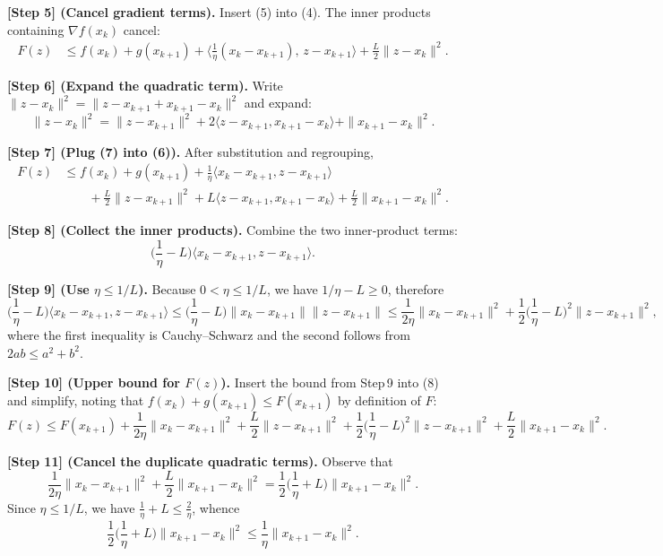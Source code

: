 \documentclass{article}
\begin{document}
\noindent\textbf{[Step 5] (Cancel gradient terms).}  
Insert (5) into (4). The inner products containing $\nabla f(x_{k})$ cancel:
\[
\begin{aligned}
F(z)&\le f(x_{k})+g(x_{k+1})
+\Big\langle\frac{1}{\eta}(x_{k}-x_{k+1}),\,z-x_{k+1}\Big\rangle
+\frac{L}{2}\|z-x_{k}\|^{2}.
\end{aligned}
\tag{6}
\]

\noindent\textbf{[Step 6] (Expand the quadratic term).}  
Write $\|z-x_{k}\|^{2}= \|z-x_{k+1}+x_{k+1}-x_{k}\|^{2}$ and expand:
\[
\|z-x_{k}\|^{2}= \|z-x_{k+1}\|^{2}+2\langle z-x_{k+1},x_{k+1}-x_{k}\rangle+\|x_{k+1}-x_{k}\|^{2}.
\tag{7}
\]

\noindent\textbf{[Step 7] (Plug (7) into (6)).}  
After substitution and regrouping,
\[
\begin{aligned}
F(z)&\le f(x_{k})+g(x_{k+1})
+\frac{1}{\eta}\langle x_{k}-x_{k+1},z-x_{k+1}\rangle\\
&\qquad+\frac{L}{2}\|z-x_{k+1}\|^{2}
+L\langle z-x_{k+1},x_{k+1}-x_{k}\rangle
+\frac{L}{2}\|x_{k+1}-x_{k}\|^{2}.
\end{aligned}
\tag{8}
\]

\noindent\textbf{[Step 8] (Collect the inner products).}  
Combine the two inner‑product terms:
\[
\Big(\frac{1}{\eta}-L\Big)\langle x_{k}-x_{k+1},z-x_{k+1}\rangle.
\tag{9}
\]

\noindent\textbf{[Step 9] (Use $\eta\le 1/L$).}  
Because $0<\eta\le 1/L$, we have $1/\eta-L\ge0$, therefore
\[
\Big(\frac{1}{\eta}-L\Big)\langle x_{k}-x_{k+1},z-x_{k+1}\rangle
\le \Big(\frac{1}{\eta}-L\Big)\|x_{k}-x_{k+1}\|\|z-x_{k+1}\|
\le \frac{1}{2\eta}\|x_{k}-x_{k+1}\|^{2}
+\frac{1}{2}\Big(\frac{1}{\eta}-L\Big)^{2}\|z-x_{k+1}\|^{2},
\]
where the first inequality is Cauchy–Schwarz and the second follows from $2ab\le a^{2}+b^{2}$.

\noindent\textbf{[Step 10] (Upper bound for $F(z)$).}  
Insert the bound from Step 9 into (8) and simplify, noting that $f(x_{k})+g(x_{k+1})\le F(x_{k+1})$ by definition of $F$:
\[
F(z)\le F(x_{k+1})+\frac{1}{2\eta}\|x_{k}-x_{k+1}\|^{2}
+\frac{L}{2}\|z-x_{k+1}\|^{2}
+\frac{1}{2}\Big(\frac{1}{\eta}-L\Big)^{2}\|z-x_{k+1}\|^{2}
+\frac{L}{2}\|x_{k+1}-x_{k}\|^{2}.
\tag{10}
\]

\noindent\textbf{[Step 11] (Cancel the duplicate quadratic terms).}  
Observe that
\[
\frac{1}{2\eta}\|x_{k}-x_{k+1}\|^{2}+ \frac{L}{2}\|x_{k+1}-x_{k}\|^{2}
=\frac{1}{2}\Big(\frac{1}{\eta}+L\Big)\|x_{k+1}-x_{k}\|^{2}.
\]
Since $\eta\le 1/L$, we have $\frac{1}{\eta}+L\le \frac{2}{\eta}$, whence
\[
\frac{1}{2}\Big(\frac{1}{\eta}+L\Big)\|x_{k+1}-x_{k}\|^{2}\le \frac{1}{\eta}\|x_{k+1}-x_{k}\|^{2}.
\tag{11}
\]
\end{document}
